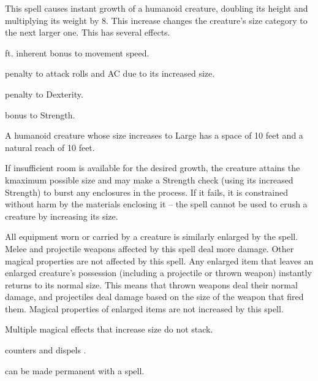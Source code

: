 \spellrng{\rngclose}
\begin{spelleffect}
  This spell causes instant growth of a humanoid creature, doubling its height and multiplying its weight by 8. This increase changes the creature's size category to the next larger one. This has several effects.
  \begin{itemize*} 
    \item {} ft. inherent bonus to movement speed.
    \item {} penalty to attack rolls and AC due to its increased size.
  \item {} penalty to Dexterity.
  \item {} bonus to Strength. \bonusscalingdescription
  \end{itemize*}
  \par A humanoid creature whose size increases to Large has a space of 10 feet and a natural reach of 10 feet.
  \par If insufficient room is available for the desired growth, the creature attains the kmaximum possible size and may make a Strength check (using its increased Strength) to burst any enclosures in the process. If it fails, it is constrained without harm by the materials enclosing it -- the spell cannot be used to crush a creature by increasing its size.
  \par All equipment worn or carried by a creature is similarly enlarged by the spell. Melee and projectile weapons affected by this spell deal more damage. Other magical properties are not affected by this spell. Any enlarged item that leaves an enlarged creature's possession (including a projectile or thrown weapon) instantly returns to its normal size. This means that thrown weapons deal their normal damage, and projectiles deal damage based on the size of the weapon that fired them. Magical properties of enlarged items are not increased by this spell.
\end{spelleffect}
\begin{spellnotes}
  Multiple magical effects that increase size do not stack.
  \par {} counters and dispels .
  \par {} can be made permanent with a  spell.
\end{spellnotes}

